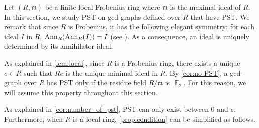 \documentclass[12pt, a4paper]{amsart}
\theoremstyle{definition}
\DeclareMathOperator{\F}{\mathbb{F}}
\newcommand{\Ann}{{\rm Ann}}
\numberwithin{equation}{section}
\begin{document}
Let $(R, \mathfrak{m})$ be a finite local Frobenius ring where $\mathfrak{m}$ is the maximal ideal of $R$.  In this section, we study PST on gcd-graphs defined over $R$ that have PST. We remark that since $R$ is Frobenius, it has the following elegant symmetry: for each ideal $I$ in $R$, $\Ann_{R}(\Ann_{R}(I))=I$ (see \cite{honold2001characterization}). As a consequence, an ideal is uniquely determined by its annihilator ideal. 

As explained in \cref{lem:local}, since $R$ is a Frobenius ring, there exists a unique $e \in R$ such that $Re$ is the unique minimal ideal in $R$. By \cref{cor:no PST}, a gcd-graph over $R$ has PST only if the residue field $R/\mathfrak{m}$ is $\F_2.$ For this reason, we will assume this property throughout this section. 

As explained in \cref{cor:number_of_pst}, PST can only exist between $0$ and $e.$ Furthermore, when $R$ is a local ring, \cref{prop:condition} can be simplified as follows. 
\end{document}
